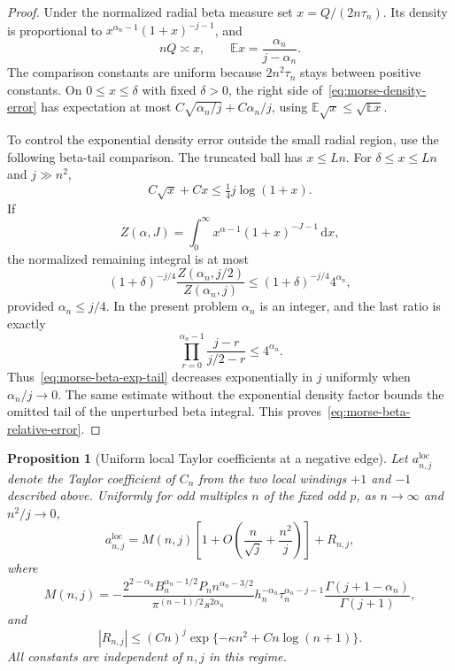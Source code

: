 \documentclass[11pt]{article}
\numberwithin{equation}{section}
\newtheorem{proposition}[theorem]{Proposition}
\theoremstyle{definition}
\newcommand{\dd}{\,\mathrm d}
\begin{document}
\begin{proof}
Under the normalized radial beta measure set
$x=Q/(2n\tau_n)$.  Its density is proportional to
$x^{\alpha_n-1}(1+x)^{-j-1}$, and
\[
 nQ\asymp x,\qquad
 \mathbb E x=\frac{\alpha_n}{j-\alpha_n}.
\]
The comparison constants are uniform because $2n^2\tau_n$ stays
between positive constants.  On $0\le x\le\delta$ with fixed
$\delta>0$, the right side of~\eqref{eq:morse-density-error} has
expectation at most
$C\sqrt{\alpha_n/j}+C\alpha_n/j$, using
$\mathbb E\sqrt x\le\sqrt{\mathbb E x}$.

To control the exponential density error outside the small radial region,
use the following beta-tail comparison.  The truncated ball has $x\le Ln$.  For
$\delta\le x\le Ln$ and $j\gg n^2$,
\[
 C\sqrt x+Cx\le\tfrac14j\log(1+x).
\]
If
\[
 Z(\alpha,J)=\int_0^\infty x^{\alpha-1}(1+x)^{-J-1}\dd x,
\]
the normalized remaining integral is at most
\begin{equation}
 (1+\delta)^{-j/4}\frac{Z(\alpha_n,j/2)}{Z(\alpha_n,j)}
 \le (1+\delta)^{-j/4}4^{\alpha_n},
 \label{eq:morse-beta-exp-tail}
\end{equation}
provided $\alpha_n\le j/4$.  In the present problem $\alpha_n$ is
an integer, and the last ratio is exactly
\[
 \prod_{r=0}^{\alpha_n-1}\frac{j-r}{j/2-r}\le4^{\alpha_n}.
\]
Thus~\eqref{eq:morse-beta-exp-tail} decreases exponentially in $j$
uniformly when $\alpha_n/j\to0$.  The same estimate without the
exponential density factor bounds the omitted tail of the unperturbed
beta integral.  This proves~\eqref{eq:morse-beta-relative-error}.
\end{proof}

\begin{proposition}[Uniform local Taylor coefficients at a negative edge]
\label{prop:negative-local-jets}
Let $a^{\mathrm{loc}}_{n,j}$ denote the Taylor coefficient of $C_n$
from the two local windings $+1$ and $-1$ described above.  Uniformly
for odd multiples $n$ of the fixed odd $p$, as $n\to\infty$ and
$n^2/j\to0$,
\begin{equation}
 a^{\mathrm{loc}}_{n,j}
 =M(n,j)\left[1+O\left(\frac n{\sqrt j}+\frac{n^2}{j}\right)\right]
 +R_{n,j},
 \label{eq:morse-final-relative}
\end{equation}
where
\begin{equation}
 \boxed{\displaystyle
 M(n,j)=
 -\frac{2^{2-\alpha_n}B_n^{\alpha_n-1/2}P_n n^{\alpha_n-3/2}}
 {\pi^{(n-1)/2}s^{2\alpha_n}}
 h_n^{-\alpha_n}\tau_n^{\alpha_n-j-1}
 \frac{\Gamma(j+1-\alpha_n)}{\Gamma(j+1)},}
 \label{eq:morse-model}
\end{equation}
and
\begin{equation}
 |R_{n,j}|\le (Cn)^j
 \exp\{-\kappa n^2+C n\log(n+1)\}.
 \label{eq:morse-final-remainder}
\end{equation}
All constants are independent of $n,j$ in this regime.
\end{proposition}
\end{document}
